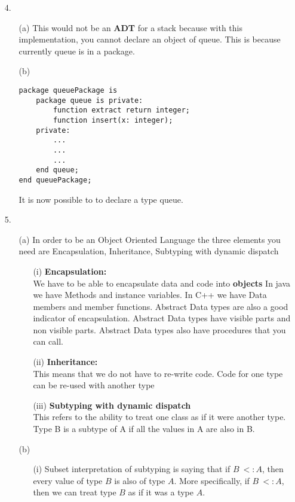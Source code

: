 \documentclass[11pt]{article}
\begin{document}
\begin{enumerate}
\begin{itemize}
\end{itemize}
\newpage
\item[4. ] 
\begin{enumerate}
\item[(a)]  This would not be an \textbf{ADT} for a stack because with this implementation, you cannot declare an object of queue.  This is because currently queue is in a package.
\item[(b)] 
\begin{verbatim}
package queuePackage is
    package queue is private:
        function extract return integer;
        function insert(x: integer);
    private:
        ...
        ...
        ...
    end queue;
end queuePackage;

\end{verbatim}
It is now possible to to declare a type queue.
\end{enumerate}
\newpage
\item[5. ]
\begin{enumerate}
\item[(a)] In order to be 	an Object Oriented Language the three elements you need are Encapsulation, Inheritance, Subtyping with dynamic dispatch
\begin{enumerate}
\item[(i)] \textbf{Encapsulation: }\\
We have to be able to encapsulate data and code into \textbf{objects}
In java we have Methods and instance variables.  In C++ we have Data members and member functions.  Abstract Data types are also a good indicator of encapsulation.  Abstract Data types have visible parts and non visible parts.  Abstract Data types also have procedures that you can call.\\ 
\item[(ii)] \textbf{Inheritance: }\\
This means that we do not have to re-write code.  Code for one type can be re-used with another type\\
\item[(iii)] \textbf{Subtyping with dynamic dispatch} \\
This refers to the ability to treat one class as if it were another type.  Type B is a subtype of A if all the values in A are also in B. \\
\end{enumerate}
\item[(b)]
\begin{enumerate}
\item[(i)] Subset interpretation of subtyping is saying that if $B\ <: A$, then every value of type $B$ is also of type $A$.  More specifically, if $B\ <: A$, then we can treat type $B$ as if it was a type $A$.\\

\end{enumerate}
\end{enumerate}
\end{enumerate}
\end{document}

